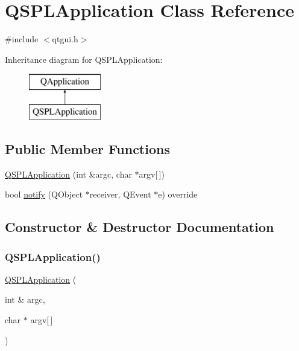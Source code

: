 \hypertarget{classQSPLApplication}{}\section{Q\+S\+P\+L\+Application Class Reference}
\label{classQSPLApplication}


{\ttfamily \#include $<$qtgui.\+h$>$}

Inheritance diagram for Q\+S\+P\+L\+Application\+:\begin{figure}[H]
\begin{center}
\leavevmode
\includegraphics[height=2.000000cm]{classQSPLApplication}
\end{center}
\end{figure}
\subsection*{Public Member Functions}
\begin{DoxyCompactItemize}
\item 
\mbox{\hyperlink{classQSPLApplication_afda8e7879376db80981cf96348d04b52}{Q\+S\+P\+L\+Application}} (int \&argc, char $\ast$argv\mbox{[}$\,$\mbox{]})
\item 
bool \mbox{\hyperlink{classQSPLApplication_a72d80fdb695d9912886cdf23fdf8c1ce}{notify}} (Q\+Object $\ast$receiver, Q\+Event $\ast$e) override
\end{DoxyCompactItemize}


\subsection{Constructor \& Destructor Documentation}
\mbox{\label{classQSPLApplication_afda8e7879376db80981cf96348d04b52}} 
\subsubsection{\texorpdfstring{Q\+S\+P\+L\+Application()}{QSPLApplication()}}
{\footnotesize\ttfamily \mbox{\hyperlink{classQSPLApplication}{Q\+S\+P\+L\+Application}} (\begin{DoxyParamCaption}\item[{int \&}]{argc,  }\item[{char $\ast$}]{argv\mbox{[}$\,$\mbox{]} }\end{DoxyParamCaption})}



